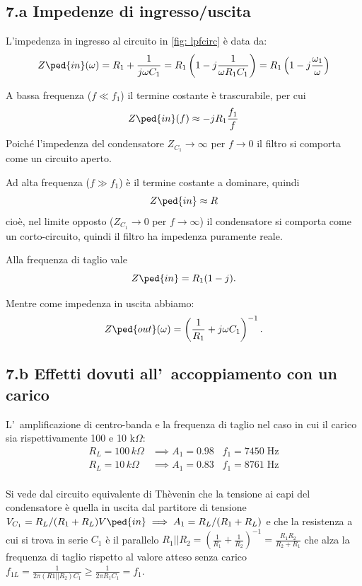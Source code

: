 \documentclass[10pt, a4paper, italian]{article}
\begin{document}
\subsection*{7.a Impedenze di ingresso/uscita}
L'impedenza in ingresso al circuito in \ref{fig: lpfcirc} è data da:
\[
Z\ped{in}(\omega) = R_1 + \frac{1}{j \omega C_1} =
R_1 \left( 1 - j \frac{1}{\omega R_1 C_1} \right) =
R_1 \left( 1 - j \frac{\omega_1}{\omega} \right)
\]

A bassa frequenza ($f \ll f_1$) il termine costante è trascurabile, per cui
\[
Z\ped{in}(f) \approx -jR_1 \frac{f_1}{f}
\]
Poiché l'impedenza del condensatore $Z_{C_1} \to \infty$ per $f \to 0$
il filtro si comporta come un circuito aperto.

Ad alta frequenza ($f \gg f_1$) è il termine costante a dominare, quindi
\[
Z\ped{in} \approx R
\]
cioè, nel limite opposto ($Z_{C_1} \to 0$ per $f \to \infty$) il
condensatore si comporta come un corto-circuito, quindi il filtro ha
impedenza puramente reale.

Alla frequenza di taglio vale
\[
Z\ped{in} = R_1 (1 - j)
.\]

Mentre come impedenza in uscita abbiamo:
\[
Z\ped{out}(\omega) = \left(\frac{1}{R_1} + j\omega C_1\right)^{-1}
.\]

\subsection*{7.b Effetti dovuti all'~accoppiamento con un carico}
L'~amplificazione di centro-banda e la frequenza di taglio nel 
caso in cui il carico sia rispettivamente 100 e 10 k$\Omega$:
\[
\begin{array}{rl}
R_L=100 \,k\Omega & \implies A_1 = 0.98 \;\;\; f_1 = 7450 \; \si{\Hz} \\
R_L=10 \,k\Omega & \implies A_1 = 0.83\;\;\; f_1 = 8761 \; \si{\Hz} \\
\end{array}
\]

Si vede dal circuito equivalente di Thèvenin che la tensione ai capi del
condensatore è quella in uscita dal partitore di tensione
$V_{C_1} = R_L/(R_1 + R_L) V\ped{in} \implies A_1 = R_L/(R_1 + R_L)$ e che
la resistenza a cui si trova in serie $C_1$ è il parallelo $R_1 || R_2 =
(\frac{1}{R_1} + \frac{1}{R_2})^{-1} = \frac{R_1 R_2}{R_2 + R_1}$ che alza
la frequenza di taglio rispetto al valore atteso senza carico
$f_{1L} = \frac{1}{2\pi (R1 || R_2) C_1} \geq \frac{1}{2\pi R_1 C_1} = f_1$.

\end{document}
